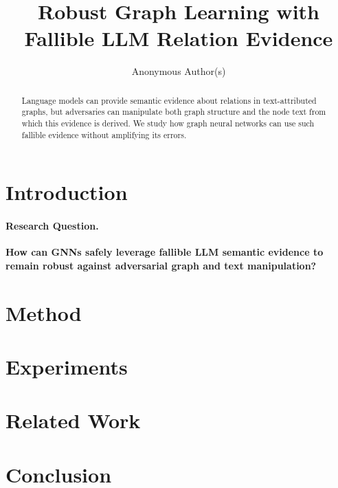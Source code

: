 \documentclass[sigconf,anonymous,review]{acmart}
\begin{document}
\title{Robust Graph Learning with Fallible LLM Relation Evidence}

\author{Anonymous Author(s)}

\begin{abstract}
Language models can provide semantic evidence about relations in text-attributed graphs, but
adversaries can manipulate both graph structure and the node text from which this evidence is
derived. We study how graph neural networks can use such fallible evidence without amplifying its
errors.
\end{abstract}


\maketitle

\section{Introduction}

\paragraph{Research Question.}
\textbf{How can GNNs safely leverage fallible LLM semantic evidence to remain robust against
adversarial graph and text manipulation?}


\section{Method}

\section{Experiments}

\section{Related Work}

\section{Conclusion}

% 
% 
\end{document}
